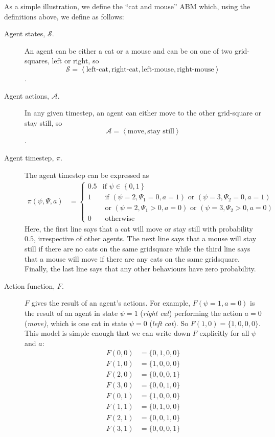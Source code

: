 \documentclass{article}
\begin{document}
As a simple illustration, we define the ``cat and mouse'' ABM which, using the definitions above, we define as follows: 
\begin{description}
	\item[Agent states, $\mathcal{S}$.] An agent can be either a cat or a mouse and can be on one of two grid-squares, left or right, so \[\mathcal{S} = \left<\textrm{left-cat}, \textrm{right-cat}, \textrm{left-mouse}, \textrm{right-mouse} \right>\]. 

	\item[Agent actions, $\mathcal{A}$.] In any given timestep, an agent can either move to the other grid-square or stay still, so \[\mathcal{A} = \left<\textrm{move}, \textrm{stay still}\right>\].


	\item[Agent timestep, $\pi$.] The agent timestep can be expressed as
	\[
	\begin{aligned}
	\pi(\psi, \Psi, a) &=
	\begin{cases}
	0.5 & \text{if } \psi \in \left\{0, 1\right\}\\  %
	1 & \text{ if }(\psi = 2, \Psi_1 = 0, a=1) \text{ or } (\psi=3, \Psi_2 = 0, a=1)\\
	& \text{ or } (\psi = 2, \Psi_1 > 0, a=0) \text{ or } (\psi=3, \Psi_2 > 0, a=0)\\
	0 & \text{ otherwise}
	\end{cases}
	\end{aligned}
	\]
	 Here, the first line says that a cat will move or stay still with probability $0.5$, irrespective of other agents. The next line says that a mouse will stay still if there are no cats on the same gridsquare while the third line says that a mouse will move if there are any cats on the same gridsquare. Finally, the last line says that any other behaviours have zero probability.

\item[Action function, $F$.] $F$ gives the result of an agent's actions. For example, $F(\psi=1, a=0)$ is the result of an agent in state $\psi=1$ (\textit{right cat}) performing the action $a=0$ (\textit{move)}, which is one cat in state $\psi=0$ (\textit{left cat}). So $F(1,0) = \{1,0,0,0\}$. This model is simple enough that we can write down $F$ explicitly for all $\psi$ and $a$:
\[
\begin{aligned}
F(0, 0) &= \{0,1,0,0\}\\
F(1, 0) &= \{1,0,0,0\}\\
F(2, 0) &= \{0,0,0,1\}\\
F(3, 0) &= \{0,0,1,0\}\\
F(0, 1) &= \{1,0,0,0\}\\
F(1, 1) &= \{0,1,0,0\}\\
F(2, 1) &= \{0,0,1,0\}\\
F(3, 1) &= \{0,0,0,1\}\\
\end{aligned}
\]
\end{description}
\end{document}
